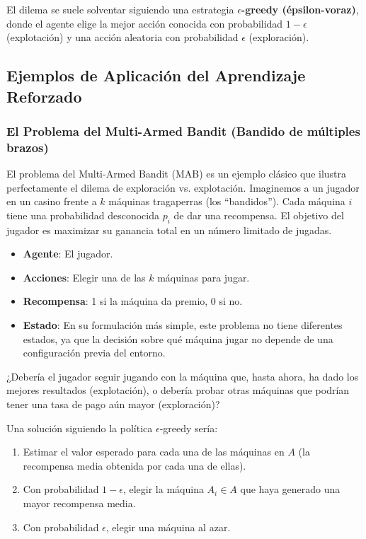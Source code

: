 \documentclass[12pt,a4paper]{book}
\begin{document}
El dilema se suele solventar siguiendo una estrategia \textbf{$\epsilon$-greedy (épsilon-voraz)}, donde el agente elige la mejor acción conocida con probabilidad $1-\epsilon$ (explotación) y una acción aleatoria con probabilidad $\epsilon$ (exploración).

\subsection{Ejemplos de Aplicación del Aprendizaje Reforzado}

\subsubsection{El Problema del Multi-Armed Bandit (Bandido de múltiples brazos)}

El problema del Multi-Armed Bandit (MAB) \cite{MAB} es un ejemplo clásico que ilustra perfectamente el dilema de exploración vs. explotación. Imaginemos a un jugador en un casino frente a $k$ máquinas tragaperras (los ``bandidos'').
Cada máquina $i$ tiene una probabilidad desconocida $p_i$ de dar una recompensa. El objetivo del jugador es maximizar su ganancia total en un número limitado de jugadas.

\begin{itemize}
    \item \textbf{Agente}: El jugador.
    \item \textbf{Acciones}: Elegir una de las $k$ máquinas para jugar.
    \item \textbf{Recompensa}: 1 si la máquina da premio, 0 si no.
    \item \textbf{Estado}: En su formulación más simple, este problema no tiene diferentes estados, ya que la decisión sobre qué máquina jugar no depende de una configuración previa del entorno.
\end{itemize}

¿Debería el jugador seguir jugando con la máquina que, hasta ahora, ha dado los mejores resultados (explotación), o debería probar otras máquinas que podrían tener una tasa de pago aún mayor (exploración)?

Una solución siguiendo la política $\epsilon$-greedy sería:
\begin{enumerate}
    \item Estimar el valor esperado para cada una de las máquinas en $A$ (la recompensa media obtenida por cada una de ellas).
    \item Con probabilidad $1-\epsilon$, elegir la máquina $A_i \in A$ que haya generado una mayor recompensa media.
    \item Con probabilidad $\epsilon$, elegir una máquina al azar.
\end{enumerate}
\end{document}
